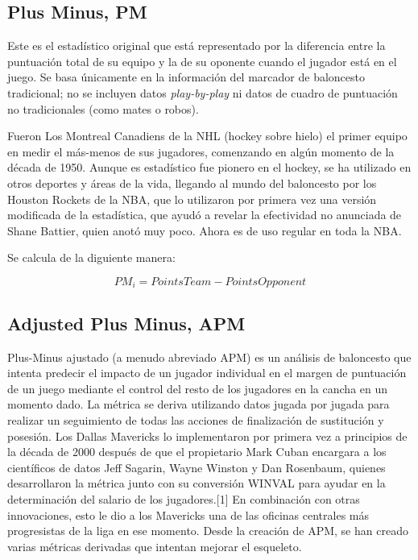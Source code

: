 \documentclass[paper=a4, fontsize=9pt]{article}
\begin{document}
\subsection{Plus Minus, PM}

Este es el estadístico original que está representado por la diferencia entre la puntuación total de su equipo y la de su oponente cuando el jugador está en el juego. Se basa únicamente en la información del marcador de baloncesto tradicional; no se incluyen datos \emph{play-by-play} ni datos de cuadro de puntuación no tradicionales (como mates o robos).

Fueron Los Montreal Canadiens de la NHL (hockey sobre hielo) el primer equipo en medir el más-menos de sus jugadores, comenzando en algún momento de la década de 1950. Aunque es estadístico fue pionero en el hockey, se ha utilizado en otros deportes y áreas de la vida, llegando al mundo del baloncesto por los Houston Rockets de la NBA, que lo utilizaron por primera vez una versión modificada de la estadística, que ayudó a revelar la efectividad no anunciada de Shane Battier, quien anotó muy poco. Ahora es de uso regular en toda la NBA. 

Se calcula de la diguiente manera:

$$PM_i = PointsTeam - PointsOpponent$$

\subsection{Adjusted Plus Minus, APM}

Plus-Minus ajustado (a menudo abreviado APM) es un análisis de baloncesto que intenta predecir el impacto de un jugador individual en el margen de puntuación de un juego mediante el control del resto de los jugadores en la cancha en un momento dado. La métrica se deriva utilizando datos jugada por jugada para realizar un seguimiento de todas las acciones de finalización de sustitución y posesión. Los Dallas Mavericks lo implementaron por primera vez a principios de la década de 2000 después de que el propietario Mark Cuban encargara a los científicos de datos Jeff Sagarin, Wayne Winston y Dan Rosenbaum, quienes desarrollaron la métrica junto con su conversión WINVAL para ayudar en la determinación del salario de los jugadores.[1] En combinación con otras innovaciones, esto le dio a los Mavericks una de las oficinas centrales más progresistas de la liga en ese momento. Desde la creación de APM, se han creado varias métricas derivadas que intentan mejorar el esqueleto.
\end{document}
